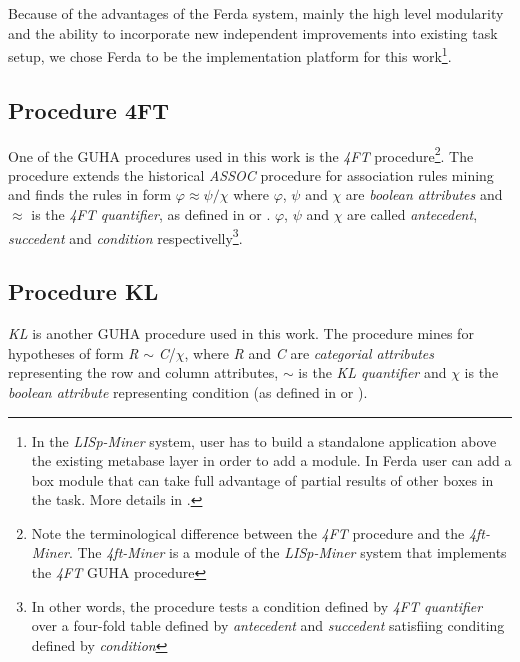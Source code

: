 \documentclass{llncs}
\begin{document}

Because of the advantages of the Ferda system, mainly the high level modularity
and the ability to incorporate new independent improvements into existing task
setup, we chose Ferda to be the implementation platform for this 
work\footnote{In the \emph{LISp-Miner} system, user has to build a standalone 
application above the existing metabase layer in order to add a module. In Ferda
user can add a box module that can take full advantage of partial results of
other boxes in the task. More details in \cite{Ferda}.}.

\subsection{Procedure 4FT}
One of the GUHA procedures used in this work is the \emph{4FT}
procedure\footnote{Note the terminological difference between 
the \emph{4FT} procedure and the \emph{4ft-Miner}. The \emph{4ft-Miner}
is a module of the \emph{LISp-Miner} system that implements the
\emph{4FT} GUHA procedure}. The procedure extends the historical
\emph{ASSOC} procedure for association rules mining and finds the rules
in form $\varphi \approx \psi / \chi$ where $\varphi$, $\psi$ and $\chi$ 
are \emph{boolean attributes} and $\approx$ is the \emph{4FT quantifier},
as defined in \cite{Kuchar} or \cite{Approach}. $\varphi$, $\psi$ and
$\chi$ are called \emph{antecedent}, \emph{succedent} and \emph{condition}
respectivelly\footnote{In other words, the procedure tests a condition
defined by \emph{4FT quantifier} over a four-fold table defined by
\emph{antecedent} and \emph{succedent} satisfiing conditing defined by
\emph{condition}}.

\subsection{Procedure KL}
\label{section:kl}
\emph{KL} is another GUHA procedure used in this work. The procedure mines
for hypotheses of form \emph{R} $\sim$ \emph{C}/$\chi$, where \emph{R} and
\emph{C} are \emph{categorial attributes} representing the row and column
attributes, $\sim$ is the \emph{KL quantifier} and $\chi$ is the \emph{boolean
attribute} representing condition (as defined in \cite{Kuchar} or \cite{KL}).
\end{document}
